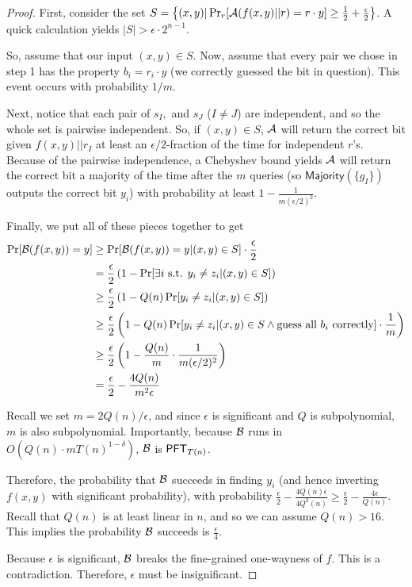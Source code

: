 \begin{proof}
	First, consider the set $S = \left\{ (x,y) | \Pr_r[\mathcal{A}(f(x,y)||r) = r\cdot y] \ge \frac 1 2 + \frac \epsilon 2 \right\}$. A quick calculation yields $|S| > \epsilon\cdot 2^{n-1}$.
	
	So, assume that our input $(x,y) \in S$. Now, assume that every pair we chose in step 1 has the property $b_i = r_i \cdot y$ (we correctly guessed the bit in question). This event occurs with probability $1/m$.
	
	Next, notice that each pair of $s_I,$ and $s_{J}$ ($I \neq J$) are independent, and so the whole set is pairwise independent. So, if $(x, y)\in S$, $\mathcal{A}$ will return the correct bit given $f(x,y)||r_I$ at least an $\epsilon/2$-fraction of the time for independent $r$'s. Because of the pairwise independence, a Chebyshev bound yields $\mathcal{A}$ will return the correct bit a majority of the time after the $m$ queries (so $\mathsf{Majority}(\{g_I\})$ outputs the correct bit $y_i$) with probability at least $1-\frac 1 {m(\epsilon/2)^2}$.
	
	Finally, we put all of these pieces together to get
	\begin{align*}
	\Pr[{\cal B}(f(x,y)) = y] & \ge \Pr[{\cal B}(f(x,y)) = y | (x,y)\in S ] \cdot \frac \epsilon 2\\
	&= \frac \epsilon 2 \left( 1 - \Pr[\exists i \mbox{ s.t. } y_i \neq z_i | (x,y) \in S] \right)\\
	&\ge \frac \epsilon 2 \left(1 - Q(n)\Pr[y_i \neq z_i | (x,y) \in S]\right)\\
	&\ge \frac \epsilon 2 \left(1 - Q(n)\Pr[y_i \neq z_i | (x,y) \in S \land \mbox{guess all $b_i$ correctly}]\cdot \frac 1 m\right)\\
	&\ge \frac \epsilon 2 \left(1 - \frac {Q(n)}{m} \cdot \frac{1}{m(\epsilon/2)^2} \right)\\
	&= \frac \epsilon 2 - \frac{4Q(n)}{m^2\epsilon}
	\end{align*}
	
	Recall we set $m = 2Q(n)/\epsilon$, and since $\epsilon$ is significant and $Q$ is subpolynomial, $m$ is also subpolynomial. Importantly, because ${\cal B}$ runs in $O(Q(n) \cdot m T(n)^{1-\delta})$, ${\cal B}$ is $\mathsf{PFT}_{T(n)}$.
	
	Therefore, the probability that ${\cal B}$ succeeds in finding $y_i$ (and hence inverting $f(x,y)$ with significant probability), with probability $\frac \epsilon 2 - \frac{4 Q(n)\epsilon}{4Q^2(n)} \ge  \frac \epsilon 2 - \frac{4\epsilon}{Q(n)}$. Recall that $Q(n)$ is at least linear in $n$, and so we can assume $Q(n) > 16$. This implies the probability ${\cal B}$ succeeds is $\frac \epsilon 4$. 
	
	Because $\epsilon$ is significant, ${\cal B}$ breaks the fine-grained one-wayness of $f$. This is a contradiction. Therefore, $\epsilon$ must be insignificant.
\end{proof}

